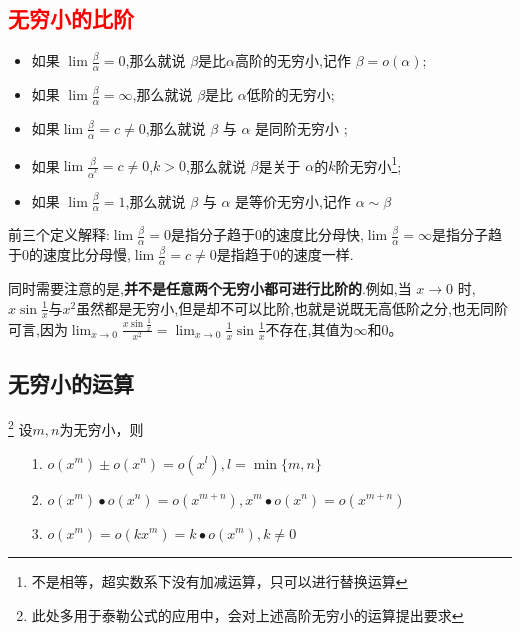 \documentclass[12pt, a4paper, oneside, UTF8]{ctexbook}
\begin{document}
\begin{sloppypar}
    \subsection{\textcolor{red}{无穷小的比阶}}
    \begin{defn}{}{}
        \begin{itemize}
            \item 如果 $\lim \frac{\beta}{\alpha} =0$,那么就说 $\beta$是比$\alpha$高阶的无穷小,记作 $\beta=o(\alpha);$
            \item  如果 $\lim \frac\beta\alpha  =\infty$,那么就说 $\beta$是比 $\alpha$低阶的无穷小;
            \item 如果$\lim\frac{\beta}{\alpha} =c\neq 0$,那么就说 $\beta$ 与 $\alpha$ 是同阶无穷小 ;
            \item 如果$\lim\frac{\beta}{\alpha^{^k}} =c \neq 0$,$k > 0$,那么就说 $\beta$是关于 $\alpha$的$k$阶无穷小\footnote{不是相等，超实数系下没有加减运算，只可以进行替换运算};
            \item 如果 $\lim \frac\beta\alpha = 1$,那么就说 $\beta$ 与 $\alpha$ 是等价无穷小,记作 $\alpha\sim\beta$
        \end{itemize}
    \end{defn}
    前三个定义解释:$\lim \frac{\beta}{\alpha} =0$是指分子趋于$0$的速度比分母快,$\lim \frac\beta\alpha  =\infty$是指分子趋于$0$的速度比分母慢,$\lim\frac{\beta}{\alpha} =c\neq 0$是指趋于$0$的速度一样.

    同时需要注意的是,\textbf{并不是任意两个无穷小都可进行比阶的}.例如,当 $x\to 0$ 时,$x\sin\frac1x$与$x^2$虽然都是无穷小,但是却不可以比阶,也就是说既无高低阶之分,也无同阶可言,因为$\lim_{x \to 0}\frac{x \sin \frac{1}{x}}{x^2}=\lim_{x\to0}\frac1x\sin\frac1x$不存在,其值为$\infty$和$0$。
    \subsection{无穷小的运算}\footnote{此处多用于泰勒公式的应用中，会对上述高阶无穷小的运算提出要求}
    设$m,n$为无穷小，则
    \begin{itemize}
        \item[1.] $o(x^{m})\pm o(x^{n})=o(x^{l}),l=\min\{m,n\}$
        \item[2.] $o(x^{m})\bullet o(x^{n})=o(x^{m+n}),x^{m}\bullet o(x^{n})=o(x^{m+n})$
        \item[3.] $o(x^{m})=o(kx^{m})=k\bullet o(x^{m}),k \neq 0$
    \end{itemize}

\end{sloppypar}
\end{document}
